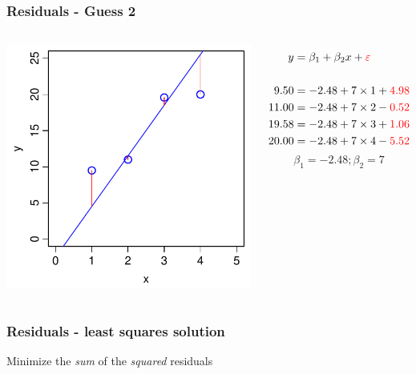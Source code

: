 \documentclass[aspectratio=43]{beamer}
\begin{document}
\frame
{\frametitle{Residuals  - Guess 2}
\begin{columns}[T]

		\includegraphics[width=\textwidth]{TooSteep.pdf}
		
		\begin{align*}
		  y  &= \beta_1 + \beta_2 x + {\color{red} \varepsilon }\\
		  \\
		  9.50  &= -2.48 + 7 \times 1 + {\color{red} 4.98}\\
		  11.00 &= -2.48 + 7 \times 2 - {\color{red} 0.52}\\
		  19.58 &= -2.48 + 7 \times 3 + {\color{red} 1.06}\\
		  20.00 &= -2.48 + 7 \times 4 - {\color{red} 5.52} 
		\end{align*}
		\[\beta_1 = -2.48; \beta_2=7\]

\end{columns}		
}


\frame
{\frametitle{Residuals - least squares solution}

Minimize the {\it sum} of the {\it squared} residuals

\begin{columns}[T]
\column{\textwidth}

\end{columns}
}
\end{document}
